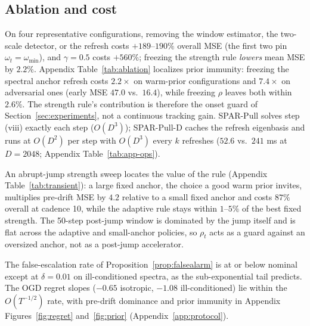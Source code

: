 \documentclass[10pt]{article}
\begin{document}
\subsection{Ablation and cost}
\label{sec:bridges}
On four representative configurations, removing the window estimator, the two-scale detector, or the refresh costs $+189$--$190\%$ overall MSE (the first two pin $\omega_t = \omega_{\min}$), and $\gamma = 0.5$ costs $+560\%$; freezing the strength rule \emph{lowers} mean MSE by $2.2\%$.
Appendix Table~\ref{tab:ablation} localizes prior immunity: freezing the spectral anchor refresh costs $2.2\times$ on warm-prior configurations and $7.4\times$ on adversarial ones (early MSE $47.0$ vs.\ $16.4$), while freezing $\rho$ leaves both within $2.6\%$.
The strength rule's contribution is therefore the onset guard of Section~\ref{sec:experiments}, not a continuous tracking gain.
SPAR-Pull solves step (viii) exactly each step ($O(D^3)$); SPAR-Pull-D caches the refresh eigenbasis and runs at $O(D^2)$ per step with $O(D^3)$ every $k$ refreshes ($52.6$ vs.\ $241$ ms at $D = 2048$; Appendix Table~\ref{tab:app-ops}).

An abrupt-jump strength sweep locates the value of the rule (Appendix Table~\ref{tab:transient}): a large fixed anchor, the choice a good warm prior invites, multiplies pre-drift MSE by $4.2$ relative to a small fixed anchor and costs $87\%$ overall at cadence 10, while the adaptive rule stays within $1$--$5\%$ of the best fixed strength.
The 50-step post-jump window is dominated by the jump itself and is flat across the adaptive and small-anchor policies, so $\rho_t$ acts as a guard against an oversized anchor, not as a post-jump accelerator.

The false-escalation rate of Proposition~\ref{prop:falsealarm} is at or below nominal except at $\delta = 0.01$ on ill-conditioned spectra, as the sub-exponential tail predicts.
The OGD regret slopes ($-0.65$ isotropic, $-1.08$ ill-conditioned) lie within the $O(T^{-1/2})$ rate, with pre-drift dominance and prior immunity in Appendix Figures~\ref{fig:regret} and~\ref{fig:prior} (Appendix~\ref{app:protocol}).
\end{document}

